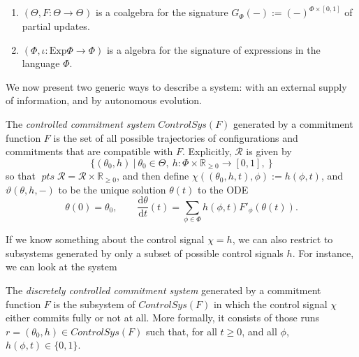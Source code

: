 \documentclass{article}
\newcommand\pts{\mathop{\mathit{pts}}}
\begin{document}
    \begin{remark}
        \begin{enumerate}
            \item 
            $(\Theta, F: \Theta \to \Theta^{})$ is a coalgebra for the signature $G_\Phi(-) := (-)^{\Phi \times [0,1]}$ of partial updates.
            \item $(\Phi, \iota : \mathrm{Exp} \Phi \to \Phi)$ is a algebra for the signature of expressions in the language $\Phi$. 
        \end{enumerate}
    \end{remark}
    
    
    We now present two generic ways to describe a system: with an external supply of information, and by autonomous evolution. 
    
    \begin{defn}
        The \emph{controlled commitment system} 
        $\mathit{ControlSys}(F)$
        generated by a commitment function $F$ is the set  of all possible trajectories of configurations and commitments that are compatible with $F$. 
        Explicitly, $\mathcal R$ is given by
        \[
            \Big\{ (\theta_0, h) ~\Big|~  \theta_0 \in \Theta,~
                h : \Phi \times \mathbb R_{\ge 0} \to [0,1],~
                 \Big\}
        \]
        so that $\pts \mathcal R = \mathcal R \times \mathbb R_{\ge 0}$,
        and then define
        $\chi((\theta_0,h,t),\phi) := h(\phi, t)$,
        and 
        $\vartheta(\theta,h,-)$ to be the unique solution $\theta(t)$ to the ODE
        \[
            \theta(0) = \theta_0,
            \qquad \frac{\mathrm d\theta}{\mathrm d t} (t) = 
                \sum_{\phi \in \Phi} h(\phi, t) F'_\phi(\theta(t)).
        \]
    \end{defn}
    
    If we know something about the control signal $\chi = h$, we can also restrict to subsystems generated by only a subset of possible 
    control signals $h$. For instance, we can look at the system 
    
    \begin{defn}
        The \emph{discretely controlled commitment system} generated by a commitment function $F$ is the subsystem of $\mathit{ControlSys}(F)$ in which the control signal $\chi$ either commits fully or not at all. 
        More formally, it consists of those runs $r = (\theta_0, h) \in \mathit{ControlSys}(F)$ such that, for all $t \ge 0$, and all $\phi$, $h(\phi, t) \in \{0,1\}$.        
    \end{defn}
\end{document}
